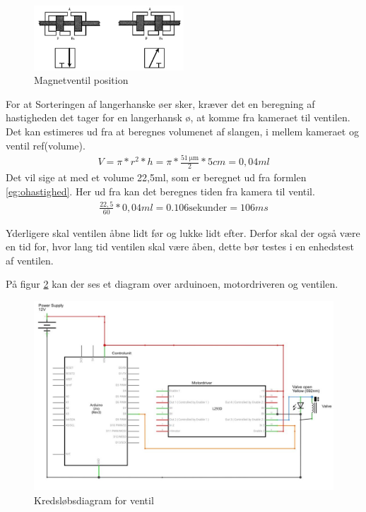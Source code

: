 \begin{figure}[H]
	\centering
	\includegraphics[width=0.5\textwidth]{billeder/Hardware/ventil.png}
	\caption{Magnetventil position}
	\label{fig:ventilpos}
\end{figure}  
For at Sorteringen af langerhanske øer sker, kræver det en beregning af hastigheden det tager for en langerhansk ø, at komme fra kameraet til ventilen. Det kan estimeres ud fra at beregnes volumenet af slangen, i mellem kameraet og ventil ref(volume).
\begin{align}
V=\pi*r^2*h=\pi*\frac{\SI{51}{\micro\metre}}{2}*5cm=0,04ml
\end{align}
 Det vil sige at med et volume 22,5ml, som er beregnet ud fra formlen \ref{eg:ohastighed}. Her ud fra kan det beregnes tiden fra kamera til ventil. 
 \begin{align}
\frac{22,5}{60}*0,04ml=0.106\text{sekunder}=106ms
\end{align}

Yderligere skal ventilen åbne lidt før og lukke lidt efter. Derfor skal der også være en tid for, hvor lang tid ventilen skal være åben, dette bør testes i en enhedstest af ventilen.

 På figur \ref{fig:ventildiagram} kan der ses et diagram over arduinoen, motordriveren og ventilen.

\begin{figure}[H]
	\centering
	\includegraphics[width=1\textwidth]{billeder/Hardware/diagrammer/ventildiagram.JPG}
	\caption{Kredsløbsdiagram for ventil}
	\label{fig:ventildiagram}
\end{figure} 

